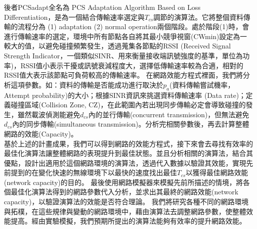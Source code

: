 \documentclass[12pt,a4paper]{article}
\begin{document}
\begin{description}
\begin{enumerate}
後者PCSadapt全名為
PCS Adaptation Algorithm Based on Loss Differentiation，是為一個結合傳輸速率選定與$T_{cs}$調節的演算法。它將整個資料傳輸的流程分為 (1) adaptation (2) normal operation兩個階段。處於階段(1)時，會進行傳輸速率的選定，環境中所有節點各自將其最小競爭視窗(CWmin)設定為一較大的值，以避免碰撞頻繁發生，透過蒐集各節點的RSSI (Received Signal Strength Indicator，一個類似SINR、用來衡量接收端訊號強度的基準，單位為功率)，RSSI值小表示干擾或訊號衰減程度大，選擇低傳輸速率較為合適，相對的RSSI值大表示該節點可負荷較高的傳輸速率。
在網路效能方程式裡面，我們將分析這項參數。如：資料的傳輸是否能成功進行取決於$p_a$(資料傳輸嘗試機率，Attempt probability)的大小；根據SINR資訊來挑選資料傳輸速率 (Data rate)；定義碰撞區域(Collision Zone, CZ)，在此範圍內若出現同步傳輸必定會導致碰撞的發生，雖然載波偵測能避免$d_{cs}$內的並行傳輸(concurrent transmission)，但無法避免$d_{cs}$內的同步傳輸(simultaneous transmission)。分析完相關參數後，再去計算整體網路的效能(Capacity)。\\

基於上述的計畫成果，我們可以得到網路的效能方程式，接下來會去尋找有效率的最佳化演算法讓整體網路的表現提升到最佳狀態。並且分析相關的演算法，結合其優點，設計出適用於這個網路環境的演算法，透過代入數據以驗證其效能，實現先前提到的在變化快速的無線環境下以最快的速度找出最佳$T_{cs}$以獲得最佳網路效能(network capacity)的目的。
最後使用網路模擬器來模擬先前所描述的情境，將各個最佳化演算法得到的網路參數代入分析，並求出其最終的網路效能(network capacity)，以驗證演算法的效能是否符合理論。
我們將研究各種不同的網路環境與拓樸，在這些規律與變動的網路環境中，藉由演算法去調整網路參數，使整體效能提高。經由實驗模擬，我們預期所提出的演算法能夠有效率的提升網路效能。\\


\end{enumerate}
\end{description}
\end{document}
